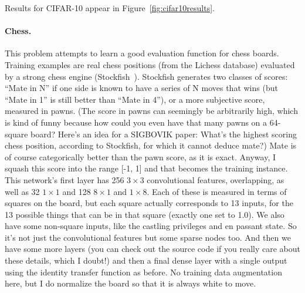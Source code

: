 \documentclass[twocolumn]{article}
\newcommand\xbyx[2]{\ensuremath{#1 {\times} #2}}
\begin{document}
Results for CIFAR-10 appear in Figure~\ref{fig:cifar10results}.

\paragraph{Chess.}
This problem attempts to learn a good evaluation function for chess
boards. Training examples are real chess positions (from the Lichess
database) evaluated by a strong chess engine
(Stockfish~\cite{stockfish}). Stockfish generates two classes of
scores: ``Mate in N'' if one side is known to have a series of N moves
that wins (but ``Mate in 1'' is still better than ``Mate in 4''), or a
more subjective score, measured in pawns. (The score in pawns can
seemingly be arbitrarily high, which is kind of funny because how
could you even have that many pawns on a 64-square board? Here's an
idea for a SIGBOVIK paper: What's the highest scoring chess position,
according to Stockfish, for which it cannot deduce mate?)
Mate is of
course categorically better than the pawn score, as it is exact.
Anyway, I squash this score into the range [-1, 1] and that becomes
the training instance. This network's first layer has 256 \xbyx{3}{3}
convolutional features, overlapping, as well as 32 \xbyx{1}{1} and
128 \xbyx{8}{1} and \xbyx{1}{8}. Each of these is measured in terms
of squares on the board, but each square actually corresponds to 13
inputs, for the 13 possible things that can be in that square (exactly
one set to 1.0). We also have some non-square inputs, like the
castling privileges and en passant state. So it's not just the
convolutional features but some sparse nodes too. And then we have
some more layers (you can check out the source code if you really care
about these details, which I doubt!) and then a final dense layer with
a single output using the identity transfer function as before. No
training data augmentation here, but I do normalize the board so that
it is always white to move.
\end{document}
